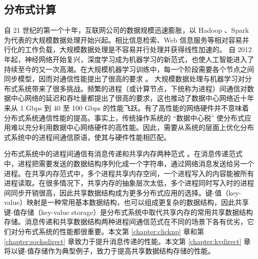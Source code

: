 


\subsection{分布式计算}
\label{background:sec:datacenter-distributed}

自 21 世纪的第一个十年，互联网公司的数据规模迅速膨胀，以 Hadoop \cite{white2012hadoop}、Spark \cite{zaharia2010spark} 为代表的大规模数据处理开始兴起。相比信息检索、Web 信息服务等相对容易并行化的工作负载，大规模数据处理是不容易并行处理并获得线性加速的。
自 2012 年起，神经网络开始复兴，深度学习成为机器学习的新范式，也使人工智能进入了持续至今的又一次高潮。在大规模机器学习训练中，每一个阶段需要各个节点之间同步模型，因而对通信性能提出了很高的要求 \cite{distributed-ml}。
大规模数据处理与机器学习对分布式系统带来了很多挑战。频繁的进程（或计算节点，下统称为进程）间通信对数据中心网络的延迟和吞吐量都提出了很高的要求，这也推动了数据中心网络近十年来从 1 Gbps 到 40 至 100 Gbps 的性能飞跃。有了高性能的网络硬件并不意味着分布式系统通信性能的提高。事实上，传统操作系统的 ``数据中心税'' 使分布式应用难以充分利用数据中心网络硬件的高性能。因此，需要从系统的层面上优化分布式系统中的进程间通信原语，使其与硬件性能相匹配。

分布式系统中的进程间通信有消息传递和共享内存两种范式 \cite{kshemkalyani2011distributed}。在消息传递范式中，进程把需要发送的数据结构序列化成一个字符串，通过网络消息发送给另一个进程。在共享内存范式中，多个进程共享内存空间，一个进程写入的内容能被所有进程读取。在很多情况下，共享内存的抽象层次太低，多个进程同时写入时的进程间同步开销很高，因此共享数据结构成为更多分布式应用的选择。键-值（key-value）映射是一种常用基本数据结构，也可以组成更复杂的数据结构，因此共享键-值存储（key-value storage）是分布式系统中取代共享内存的常用共享数据结构存储。消息传递和共享数据结构两种进程间通信范式在不同的场景下各有优劣，它们对分布式系统的性能都很重要。本文第 \ref{chapter:clicknp} 章和第 \ref{chapter:socksdirect} 章致力于提升消息传递的性能。本文第 \ref{chapter:kvdirect} 章将以键-值存储作为典型例子，致力于提高共享数据结构存储的性能。







